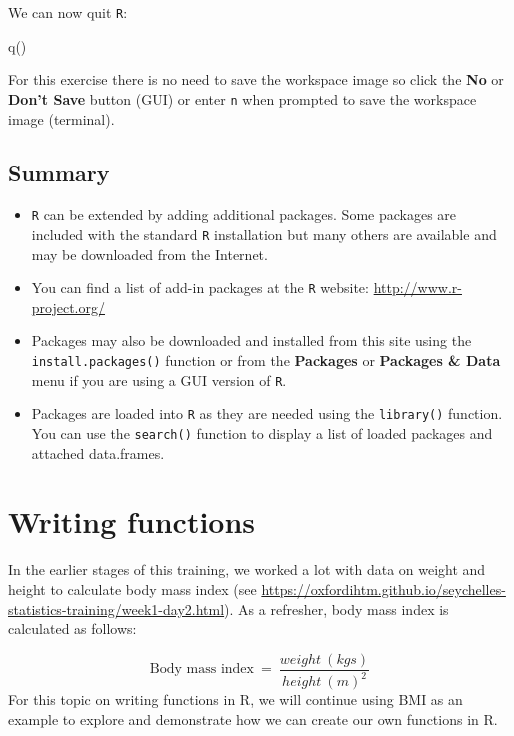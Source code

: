 \documentclass[
  12pt,
]{book}
\newenvironment{Shaded}{\begin{snugshade}}{\end{snugshade}}
\newcommand{\FunctionTok}[1]{\textcolor[rgb]{0.00,0.00,0.00}{#1}}
\newcommand{\NormalTok}[1]{#1}
\begin{document}
We can now quit \texttt{R}:

\begin{Shaded}
\begin{Highlighting}[]
\FunctionTok{q}\NormalTok{()}
\end{Highlighting}
\end{Shaded}

For this exercise there is no need to save the workspace image so click the \textbf{No} or \textbf{Don't Save} button (GUI) or enter \texttt{n} when prompted to save the workspace image (terminal).

\hypertarget{summary-2}{%
\section{Summary}\label{summary-2}}

\begin{itemize}
\item
  \texttt{R} can be extended by adding additional packages. Some packages are included with the standard \texttt{R} installation but many others are available and may be downloaded from the Internet.
\item
  You can find a list of add-in packages at the \texttt{R} website: \url{http://www.r-project.org/}
\item
  Packages may also be downloaded and installed from this site using the \texttt{install.packages()} function or from the \textbf{Packages} or \textbf{Packages \& Data} menu if you are using a GUI version of \texttt{R}.
\item
  Packages are loaded into \texttt{R} as they are needed using the \texttt{library()} function. You can use the \texttt{search()} function to display a list of loaded packages and attached data.frames.
\end{itemize}

\hypertarget{write-functions}{%
\chapter{Writing functions}\label{write-functions}}

In the earlier stages of this training, we worked a lot with data on weight and height to calculate body mass index (see \url{https://oxfordihtm.github.io/seychelles-statistics-training/week1-day2.html}). As a refresher, body mass index is calculated as follows:

\[ \text{Body mass index} ~=~ \frac{weight ~ (kgs)}{height ~ (m) ^ 2} \]
For this topic on writing functions in R, we will continue using BMI as an example to explore and demonstrate how we can create our own functions in R.
\end{document}

